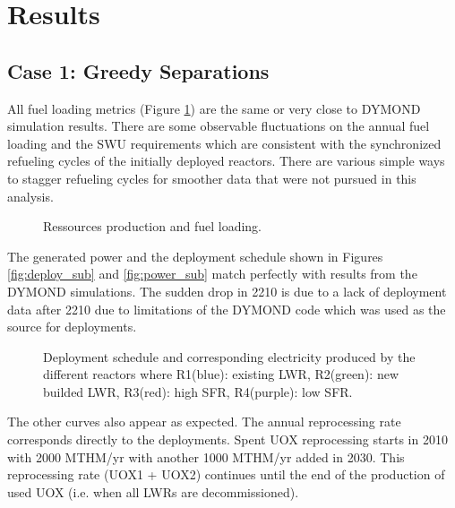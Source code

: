 \documentclass[12pt]{article}
\begin{document}
\section{Results}

\subsection{Case 1: Greedy Separations}

All fuel loading metrics (Figure \ref{fig:RessourceUsed}) are the same or very
close to DYMOND simulation results. There are some observable fluctuations on
the annual fuel loading and the SWU requirements which are consistent with the
synchronized refueling cycles of the initially deployed reactors.  There are
various simple ways to stagger refueling cycles for smoother data that were
not pursued in this analysis.

\begin{figure}[h!]
    \centering
    \caption{Ressources production and fuel loading.\label{fig:RessourceUsed} }
\end{figure}

The generated power and the deployment schedule shown in Figures
\ref{fig:deploy_sub} and \ref{fig:power_sub} match perfectly with results from
the DYMOND simulations. The sudden drop in 2210 is due to a lack of deployment
data after 2210 due to limitations of the DYMOND code which was used as the
source for deployments.

\begin{figure}[h!]
    \centering
    \caption{Deployment schedule and corresponding
    electricity produced by the different reactors
    where R1(blue): existing LWR, R2(green): new
    builded LWR, R3(red): high SFR, R4(purple): low
    SFR.\label{fig:deployment_bis} }
\end{figure}

The other curves also appear as expected. The annual reprocessing rate
corresponds directly to the deployments. Spent UOX reprocessing starts in 2010
with 2000 MTHM/yr with another 1000 MTHM/yr added in 2030.  This reprocessing
rate (UOX1 + UOX2) continues until the end of the production of used UOX (i.e.
when all LWRs are decommissioned).
\end{document}

